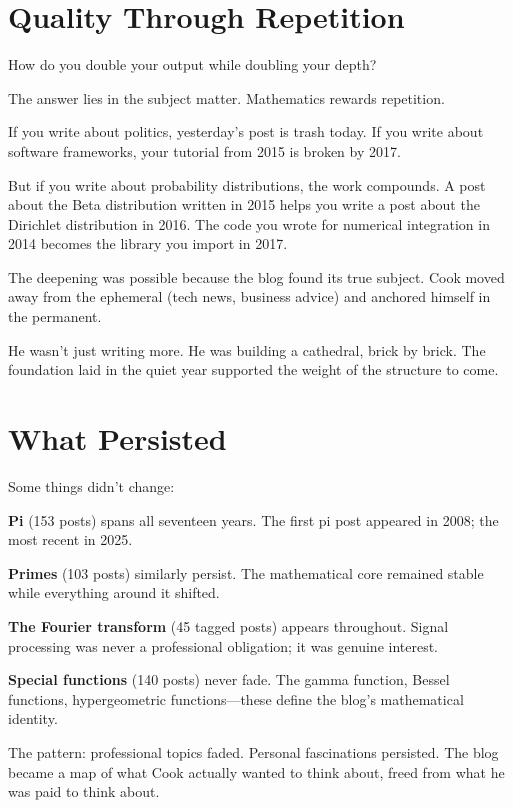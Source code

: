 \section*{Quality Through Repetition}

How do you double your output while doubling your depth?

The answer lies in the subject matter. Mathematics rewards repetition.

If you write about politics, yesterday's post is trash today. If you write about software frameworks, your tutorial from 2015 is broken by 2017.

But if you write about probability distributions, the work compounds. A post about the Beta distribution written in 2015 helps you write a post about the Dirichlet distribution in 2016. The code you wrote for numerical integration in 2014 becomes the library you import in 2017.

The deepening was possible because the blog found its true subject. Cook moved away from the ephemeral (tech news, business advice) and anchored himself in the permanent.

He wasn't just writing more. He was building a cathedral, brick by brick. The foundation laid in the quiet year supported the weight of the structure to come.

\bigskip

\section*{What Persisted}

Some things didn't change:

\textbf{Pi} (153 posts) spans all seventeen years. The first pi post appeared in 2008; the most recent in 2025.

\textbf{Primes} (103 posts) similarly persist. The mathematical core remained stable while everything around it shifted.

\textbf{The Fourier transform} (45 tagged posts) appears throughout. Signal processing was never a professional obligation; it was genuine interest.

\textbf{Special functions} (140 posts) never fade. The gamma function, Bessel functions, hypergeometric functions---these define the blog's mathematical identity.

The pattern: professional topics faded. Personal fascinations persisted. The blog became a map of what Cook actually wanted to think about, freed from what he was paid to think about.

